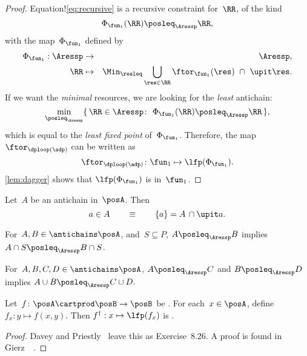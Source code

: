 \begin{proof}
    Equation!\cref{eq:recursive} is a recursive constraint for~$\RR$,
    of the kind
    \begin{equation*}
        \Phi_{\fun_{1}}(\RR)\posleq_{\Aressp}\RR,
    \end{equation*}
    with the map~$\Phi_{\fun_{1}}$ defined by
    \begin{eqnarray}
        \Phi_{\fun_{1}}:\Aressp & \to & \Aressp,\label{eq:bigphi}\\
        \RR & \mapsto & \Min_{\resleq}\bigcup_{\res\in\RR}\ftor_{\fun_{1}}(\res)\ \cap\ \upit\res.\nonumber
    \end{eqnarray}
    If we want the \emph{minimal} resources, we are looking for the \emph{least}
    antichain:
    \begin{equation*}
        \min_{\posleq_{\Aressp}}\{\,\RR\in\Aressp\colon\ \Phi_{\fun_{1}}(\RR)\posleq_{\Aressp}\RR\,\},
    \end{equation*}
    which is equal to the \emph{least fixed point }of~$\Phi_{\fun_{1}}$.
    Therefore, the map $\ftor_{\dploop(\adp)}$ can be written as
    \begin{equation}
        \ftor_{\dploop(\adp)}\colon\fun_{1}\mapsto\lfp(\Phi_{\fun_{1}}).\label{eq:loop_fixpoint}
    \end{equation}
    \cref{lem:dagger} shows that $\lfp(\Phi_{\fun_{1}})$ is \scottcontinuous
    in~$\fun_{1}$.
\end{proof}

\begin{lemma}
    \label{lem:antichain-write}Let~$A$ be an antichain in~$\posA$.
    Then
    \begin{equation*}
        a\in A\qquad\equiv\qquad\{a\}=A\,\cap\upit a.
    \end{equation*}
\end{lemma}

\begin{lemma}
    \label{lem:antichain_inter}For~$A,B\in\antichains\posA$, and~$S\subseteq P$,
    $A\posleq_{\Aressp}B$ implies $A\cap S\posleq_{\Aressp}B\cap S$.
\end{lemma}

\begin{lemma}
    \label{lem:antichain_union}For~$A,B,C,D\in\antichains\posA$, $A\posleq_{\Aressp}C$
    and $B\posleq_{\Aressp}D$ implies $A\cup B\posleq_{\Aressp}C\cup D.$
\end{lemma}

\begin{lemma}
    \label{lem:dagger}Let~$f\colon\posA\cartprod\posB\to\posB$
    be \scottcontinuous. For each~$x\in\posA$, define $f_{x}:y\mapsto f(x,y).$
    Then $f^{\dagger}:x\mapsto\lfp(f_{x})$ is \scottcontinuous.
\end{lemma}
\begin{proof}
    Davey and Priestly~\cite{davey02} leave this as Exercise~8.26.
    A proof is found in Gierz~\etal~\cite[Exercise II-2.29]{gierz03continuous}.
\end{proof}

